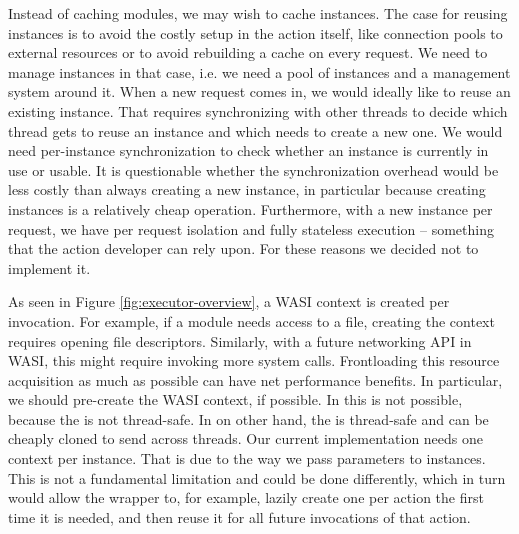 Instead of caching modules, we may wish to cache instances. The case for reusing instances is to avoid the costly setup in the action itself, like connection pools to external resources or to avoid rebuilding a cache on every request.
We need to manage instances in that case, i.e. we need a pool of instances and a management system around it. When a new request comes in, we would ideally like to reuse an existing instance. That requires synchronizing with other threads to decide which thread gets to reuse an instance and which needs to create a new one. We would need per-instance synchronization to check whether an instance is currently in use or usable. It is questionable whether the synchronization overhead would be less costly than always creating a new instance, in particular because creating instances is a relatively cheap operation. 
Furthermore, with a new instance per request, we have per request isolation and fully stateless execution -- something that the action developer can rely upon. For these reasons we decided not to implement it.

As seen in Figure \ref{fig:executor-overview}, a WASI context is created per  invocation. For example, if a module needs access to a file, creating the context requires opening file descriptors. Similarly, with a future networking API in WASI, this might require invoking more system calls. Frontloading this resource acquisition as much as possible can have net performance benefits. In particular, we should pre-create the WASI context, if possible. In  this is not possible, because the  is not thread-safe. In  on other hand, the  is thread-safe and can be cheaply cloned to send across threads. Our current implementation needs one context per instance. That is due to the way we pass parameters to instances. This is not a fundamental limitation and could be done differently, which in turn would allow the  wrapper to, for example, lazily create one  per action the first time it is needed, and then reuse it for all future invocations of that action.

